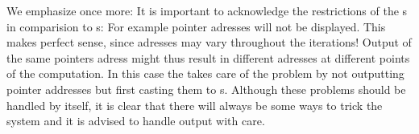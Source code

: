 We emphasize once more: It is important to acknowledge the restrictions of the s in comparision to s: For example pointer adresses will not be displayed. This makes perfect sense, since adresses may vary throughout the iterations! Output of the same pointers adress might thus result in different adresses at different points of the computation. In this case the \irram takes care of the problem by not outputting pointer addresses but first casting them to s.  Although these problems should be handled by \irram itself, it is clear that there will always be some ways to trick the system and it is advised to handle output with care.
